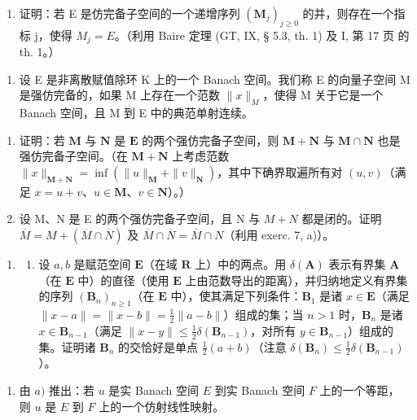 \begin{enumerate}
\def\labelenumi{\alph{enumi})}
\setcounter{enumi}{1}
\tightlist
\item
  证明：若 E 是仿完备子空间的一个递增序列 \((\mathbf{M}_{j})_{j\geq0}\) 的并，则存在一个指标 j，使得 \(M_{j}=E\)。（利用 Baire 定理 (GT, IX, § 5.3, th. 1) 及 I, 第 17 页 的 th. 1。）
\end{enumerate}

\begin{enumerate}
\def\labelenumi{\arabic{enumi})}
\setcounter{enumi}{7}
\tightlist
\item
  设 E 是非离散赋值除环 K 上的一个 Banach 空间。我们称 E 的向量子空间 M 是强仿完备的，如果 M 上存在一个范数 \(\|x\|_{M}\)，使得 M 关于它是一个 Banach 空间，且 M 到 E 中的典范单射连续。
\end{enumerate}

\begin{enumerate}
\def\labelenumi{\alph{enumi})}
\item
  证明：若 \(\mathbf{M}\) 与 \(\mathbf{N}\) 是 \(\mathbf{E}\) 的两个强仿完备子空间，则 \(\mathbf{M} + \mathbf{N}\) 与 \(\mathbf{M} \cap \mathbf{N}\) 也是强仿完备子空间。（在 \(\mathbf{M} + \mathbf{N}\) 上考虑范数 \(\|x\|_{\mathbf{M} + \mathbf{N}} = \inf (\|u\|_{\mathbf{M}} + \|v\|_{\mathbf{N}})\)，其中下确界取遍所有对 \((u, v)\)（满足 \(x = u + v\)、\(u \in \mathbf{M}\)、\(v \in \mathbf{N}\)）。）
\item
  设 M、N 是 E 的两个强仿完备子空间，且 N 与 \(M + N\) 都是闭的。证明 \(\overline{M} = M + (\overline{M} \cap \overline{N})\) 及 \(\overline{M} \cap \overline{N} = \overline{M} \cap N\)（利用 exerc. 7, a)）。
\end{enumerate}

\begin{enumerate}
\def\labelenumi{\arabic{enumi})}
\setcounter{enumi}{8}
\tightlist
\item
  \begin{enumerate}
  \def\labelenumii{\alph{enumii})}
  \tightlist
  \item
    设 \(a, b\) 是赋范空间 \(\mathbf{E}\)（在域 \(\mathbf{R}\) 上）中的两点。用 \(\delta(\mathbf{A})\) 表示有界集 \(\mathbf{A}\)（在 \(\mathbf{E}\) 中）的直径（使用 \(\mathbf{E}\) 上由范数导出的距离），并归纳地定义有界集的序列 \((\mathbf{B}_n)_{n \geqslant 1}\)（在 \(\mathbf{E}\) 中），使其满足下列条件：\(\mathbf{B}_1\) 是诸 \(x \in \mathbf{E}\)（满足 \(\|x - a\| = \|x - b\| = \frac{1}{2}\|a - b\|\)）组成的集；当 \(n > 1\) 时，\(\mathbf{B}_n\) 是诸 \(x \in \mathbf{B}_{n-1}\)（满足 \(\|x - y\| \leqslant \frac{1}{2}\delta(\mathbf{B}_{n-1})\)，对所有 \(y \in \mathbf{B}_{n-1}\)）组成的集。证明诸 \(\mathbf{B}_n\) 的交恰好是单点 \(\frac{1}{2}(a + b)\)（注意 \(\delta(\mathbf{B}_n) \leqslant \frac{1}{2}\delta(\mathbf{B}_{n-1})\)）。
  \end{enumerate}
\end{enumerate}

\begin{enumerate}
\def\labelenumi{\alph{enumi})}
\setcounter{enumi}{1}
\tightlist
\item
  由 \(a)\) 推出：若 \(u\) 是实 Banach 空间 \(E\) 到实 Banach 空间 \(F\) 上的一个等距，则 \(u\) 是 \(E\) 到 \(F\) 上的一个仿射线性映射。
\end{enumerate}


